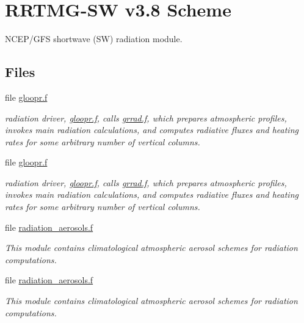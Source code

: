 \hypertarget{group___s_w-_r_r_t_m3}{}\section{R\+R\+T\+M\+G-\/\+SW v3.8 Scheme}
\label{group___s_w-_r_r_t_m3}


N\+C\+E\+P/\+G\+FS shortwave (SW) radiation module.  


\subsection*{Files}
\begin{DoxyCompactItemize}
\item 
file \hyperlink{gloopr_8f}{gloopr.\+f}
\begin{DoxyCompactList}\small\item\em radiation driver, \hyperlink{gloopr_8f}{gloopr.\+f}, calls \hyperlink{grrad_8f}{grrad.\+f}, which prepares atmospheric profiles, invokes main radiation calculations, and computes radiative fluxes and heating rates for some arbitrary number of vertical columns. \end{DoxyCompactList}\item 
file \hyperlink{gloopr_8f}{gloopr.\+f}
\begin{DoxyCompactList}\small\item\em radiation driver, \hyperlink{gloopr_8f}{gloopr.\+f}, calls \hyperlink{grrad_8f}{grrad.\+f}, which prepares atmospheric profiles, invokes main radiation calculations, and computes radiative fluxes and heating rates for some arbitrary number of vertical columns. \end{DoxyCompactList}\item 
file \hyperlink{radiation__aerosols_8f}{radiation\+\_\+aerosols.\+f}
\begin{DoxyCompactList}\small\item\em This module contains climatological atmospheric aerosol schemes for radiation computations. \end{DoxyCompactList}\item 
file \hyperlink{radiation__aerosols_8f}{radiation\+\_\+aerosols.\+f}
\begin{DoxyCompactList}\small\item\em This module contains climatological atmospheric aerosol schemes for radiation computations. \end{DoxyCompactList}\item 

\end{DoxyCompactItemize}
